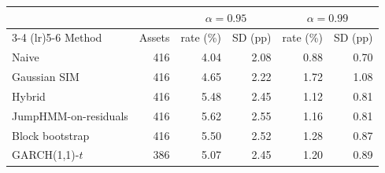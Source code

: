 \begin{tabular}{lrrrrr}
\toprule
 & & \multicolumn{2}{c}{$\alpha = 0.95$} & \multicolumn{2}{c}{$\alpha = 0.99$} \\
\cmidrule(lr){3-4} \cmidrule(lr){5-6}
Method & Assets & rate (\%) & SD (pp) & rate (\%) & SD (pp) \\
\midrule
Naive & 416 & 4.04 & 2.08 & 0.88 & 0.70 \\
Gaussian SIM & 416 & 4.65 & 2.22 & 1.72 & 1.08 \\
Hybrid & 416 & 5.48 & 2.45 & 1.12 & 0.81 \\
JumpHMM-on-residuals & 416 & 5.62 & 2.55 & 1.16 & 0.81 \\
Block bootstrap & 416 & 5.50 & 2.52 & 1.28 & 0.87 \\
GARCH(1,1)-$t$ & 386 & 5.07 & 2.45 & 1.20 & 0.89 \\
\bottomrule
\end{tabular}

